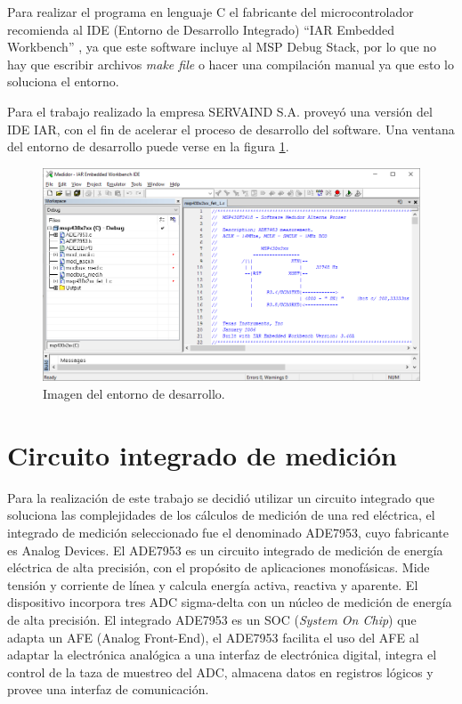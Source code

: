 
Para realizar el programa en lenguaje C el fabricante del microcontrolador recomienda al IDE (Entorno de Desarrollo Integrado) \textquotedblleft IAR Embedded Workbench\textquotedblright \cite{iarembddworkbnch} , ya que este software incluye al  MSP Debug Stack, por lo que no hay que escribir archivos \textit{make file} o hacer una compilación manual ya que esto lo soluciona el entorno.

Para el trabajo realizado la empresa SERVAIND S.A. proveyó una versión del IDE IAR, con el fin de acelerar el proceso de desarrollo del software. Una ventana del entorno de desarrollo puede verse en la figura \ref{fig:IARwindow}.

\begin{figure}[h]
	\centering
	\includegraphics[width=\textwidth,keepaspectratio]{Figures/Embeddedworkbench.png}
	\caption{Imagen del entorno de desarrollo.}
	\label{fig:IARwindow}
\end{figure}



\section{Circuito integrado de medición}
\label{sec:cap2parte3}

Para la realización de este trabajo se decidió utilizar un circuito integrado que soluciona las complejidades de los cálculos de medición de una red eléctrica, el integrado de medición seleccionado fue el denominado ADE7953, cuyo fabricante es Analog Devices. El ADE7953 es un circuito integrado de medición de energía eléctrica de alta precisión, con el propósito de aplicaciones monofásicas. Mide tensión y corriente de línea y calcula energía activa, reactiva y aparente. El dispositivo incorpora tres ADC sigma-delta con un núcleo de medición de energía de alta precisión. El integrado ADE7953 es un SOC (\textit{System On Chip}) que adapta un AFE (Analog Front-End), el ADE7953 facilita el uso del AFE al adaptar la electrónica analógica a una interfaz de electrónica digital, integra el control de la taza de muestreo del ADC, almacena datos en registros lógicos y provee una interfaz de comunicación.

